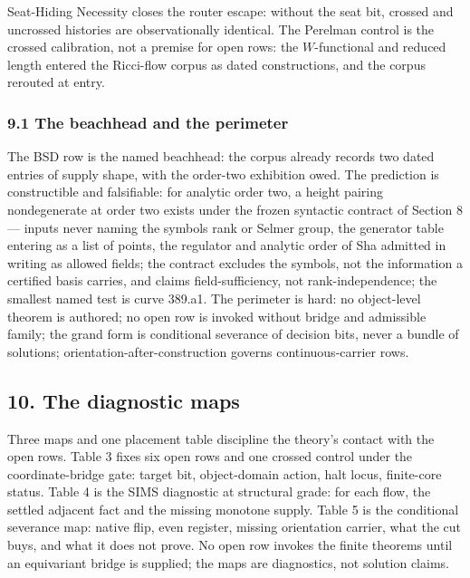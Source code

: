 \documentclass[10pt]{article}
\renewcommand{\_}{\origunderscore\allowbreak}
\begin{document}
Seat-Hiding Necessity closes the router escape: without the seat bit,
crossed and uncrossed histories are observationally identical. The
Perelman control is the crossed calibration, not a premise for open
rows: the \(W\)-functional and reduced length entered the Ricci-flow
corpus as dated constructions, and the corpus rerouted at entry.

\hypertarget{the-beachhead-and-the-perimeter}{%
\subsubsection{9.1 The beachhead and the
perimeter}\label{the-beachhead-and-the-perimeter}}

The BSD row is the named beachhead: the corpus already records two dated
entries of supply shape, with the order-two exhibition owed. The
prediction is constructible and falsifiable: for analytic order two, a
height pairing nondegenerate at order two exists under the frozen
syntactic contract of Section 8 --- inputs never naming the symbols rank
or Selmer group, the generator table entering as a list of points, the
regulator and analytic order of Sha admitted in writing as allowed
fields; the contract excludes the symbols, not the information a
certified basis carries, and claims field-sufficiency, not
rank-independence; the smallest named test is curve 389.a1. The
perimeter is hard: no object-level theorem is authored; no open row is
invoked without bridge and admissible family; the grand form is
conditional severance of decision bits, never a bundle of solutions;
orientation-after-construction governs continuous-carrier rows.

\hypertarget{the-diagnostic-maps}{%
\subsection{10. The diagnostic maps}\label{the-diagnostic-maps}}

Three maps and one placement table discipline the theory's contact with
the open rows. Table 3 fixes six open rows and one crossed control under
the coordinate-bridge gate: target bit, object-domain action, halt
locus, finite-core status. Table 4 is the SIMS diagnostic at structural
grade: for each flow, the settled adjacent fact and the missing monotone
supply. Table 5 is the conditional severance map: native flip, even
register, missing orientation carrier, what the cut buys, and what it
does not prove. No open row invokes the finite theorems until an
equivariant bridge is supplied; the maps are diagnostics, not solution
claims.
\end{document}
